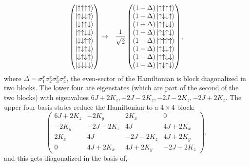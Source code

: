 \documentclass[aps,amsmath,twocolumn,amssymb,floatfix,showpacs,superscriptaddress,nofootinbib,longbibliography]{revtex4-1}
\begin{document}
\begin{eqnarray}
	\begin{pmatrix}
	\ket{\uparrow\uparrow\uparrow\uparrow}\\
	\ket{\uparrow\downarrow\downarrow\uparrow}	\\
	\ket{\downarrow\uparrow\uparrow\downarrow}	\\
	\ket{\uparrow\uparrow\downarrow\downarrow}	\\
	\ket{\downarrow\downarrow\uparrow\uparrow}	\\
	\ket{\uparrow\downarrow\uparrow\downarrow}	\\
	\ket{\downarrow\uparrow\downarrow\uparrow}	\\
	\ket{\downarrow\downarrow\downarrow\downarrow}
\end{pmatrix}
&
\rightarrow
&
\frac{1}{\sqrt{2}}
\begin{pmatrix}
(1+\Delta)\ket{\uparrow\uparrow\uparrow\uparrow}\\
(1+\Delta)\ket{\uparrow\downarrow\downarrow\uparrow}\\
(1+\Delta)\ket{\uparrow\uparrow\downarrow\downarrow}\\
(1+\Delta)\ket{\uparrow\downarrow\uparrow\downarrow}\\
(1-\Delta)\ket{\uparrow\uparrow\uparrow\uparrow}\\
(1-\Delta)\ket{\uparrow\downarrow\downarrow\uparrow}\\
(1-\Delta)\ket{\uparrow\uparrow\downarrow\downarrow}\\
(1-\Delta)\ket{\uparrow\downarrow\uparrow\downarrow}\\
\end{pmatrix},
\end{eqnarray}
where $\Delta=\sigma_{1}^{x}\sigma_{2}^{x}\sigma_{3}^{x}\sigma_{4}^{x}$, the even-sector of the Hamiltonian is block diagonalized in two blocks. The lower four are eigenstates (which are part of the second of the two blocks) with eigenvalues $6J+2K_z,-2J-2K_z,-2J-2K_z,-2J+2K_z$. The upper four basis states reduce the Hamiltonian to a $4\times4$ block:
\begin{equation}
	\begin{pmatrix}
		6J+2K_z&-2K_y&2K_x&0\\
		-2K_y&-2J-2K_z&4J&4J+2K_x\\
		2K_x&4J&-2J-2K_z&4J+2K_y\\
		0&4J+2K_x&4J+2K_y&-2J+2K_z
	\end{pmatrix},
\end{equation}
and this gets diagonalized in the basis of,
\end{document}
